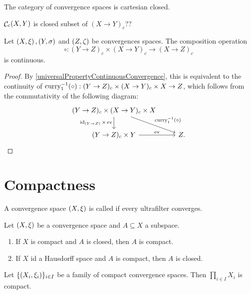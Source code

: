 \begin{corollary}
The category of convergence spaces is cartesian closed.
\end{corollary}

\begin{proposition}
$\mathop{\mathcal{C}}_c(X,Y)$ is closed subset of $(X\to Y)_c$??
\end{proposition}

\begin{proposition}
Let $\left( X, \xi \right), \left( Y,\sigma \right)$ and $\left( Z,\zeta \right)$ be convergences spaces. The composition operation
\[ \circ: (Y\to Z)_c \times (X\to Y)_c \to (X\to Z)_c \]
is continuous.
\end{proposition}
\begin{proof}
By \ref{universalPropertyContinuousConvergence}, this is equivalent to the continuity of $\operatorname{curry}_1^{-1}(\circ): (Y\to Z)_c \times (X\to Y)_c \times X \to Z$, which follows from the commutativity of the following diagram:
\[\begin{tikzcd}
(Y\to Z)_c \times (X\to Y)_c \times X \ar[d, swap, "\id_{(Y\to Z)}\times \evalMap"] \ar[dr, "\curry_1^{-1}(\circ)"] & \\
(Y\to Z)_c\times Y \ar[r, "\evalMap"] & Z.
\end{tikzcd} \]
\end{proof}

\section{Compactness}
\begin{definition}
A convergence space $\left( X,\xi \right)$ is called  if every ultrafilter converges.
\end{definition}

\begin{proposition}
Let $\left( X,\xi \right)$ be a convergence space and $A\subseteq X$ a subspace.
\begin{enumerate}
\item If $X$ is compact and $A$ is closed, then $A$ is compact.
\item If $X$ id a Hausdorff space and $A$ is compact, then $A$ is closed.
\end{enumerate}
\end{proposition}

\begin{theorem}[Tychonoff]
Let $\{\left( X_i, \xi_i \right)\}_{i\in I}$ be a family of compact convergence spaces. Then $\prod_{i\in I}X_i$ is compact.
\end{theorem}

